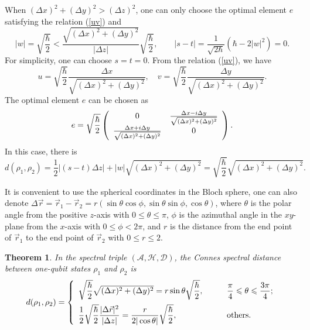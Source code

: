 \documentclass[a4paper,12pt]{article}
\newtheorem{theorem}{Theorem}
\begin{document}
When $(\Delta x)^2+(\Delta y)^2> (\Delta z)^2$,
one can only choose the optimal element $e$ satisfying the relation (\ref{uv}) and
\begin{equation}
	|w|
	=\sqrt{\frac{\hbar}{2}}<\frac{\sqrt{(\Delta x)^2+(\Delta y)^2}}{|\Delta z|}\sqrt{\frac{\hbar}{2}},\qquad
	|s-t|=\frac{1}{\sqrt{2\hbar}}(\hbar-2|w|^2)=0.
\end{equation}
For simplicity, one can choose $s=t=0$.
From the relation (\ref{uv}), we have
\begin{equation}
	u=\sqrt{\frac{\hbar}{2}}\frac{\Delta x}{\sqrt{(\Delta x)^2+(\Delta y)^2}},\quad v=\sqrt{\frac{\hbar}{2}}\frac{\Delta y}{\sqrt{(\Delta x)^2+(\Delta y)^2}}.
\end{equation}
The optimal element $e$ can be chosen as
\begin{equation}
	e=\sqrt{\frac{\hbar}{2}}\left(
	\begin{array}{cc}
		0 & \frac{\Delta x-{\rm i}\Delta y}{\sqrt{(\Delta x)^2+(\Delta y)^2}} \\[0.5em]
		\frac{\Delta x+{\rm i}\Delta y}{\sqrt{(\Delta x)^2+(\Delta y)^2}} & 0 \end{array}
	\right).
\end{equation}
In this case, there is
\begin{equation}\label{sd2}
	d(\rho_1,\rho_2)
	=\frac{1}{2}|(s-t)\Delta z|
	+|w|\sqrt{(\Delta x)^2+(\Delta y)^2}
	=\sqrt{\frac{\hbar}{2}}\sqrt{(\Delta x)^2+(\Delta y)^2}.
\end{equation}



It is convenient to use the spherical coordinates in the Bloch sphere, one can also denote $\Delta \vec{r}=\vec{r}_1-\vec{r}_2=r(\sin\theta\cos\phi, \sin\theta\sin\phi, \cos\theta)$, where $\theta$ is the polar angle from the positive $z$-axis with
$0\leqslant\theta\leqslant \pi$, $\phi$ is the azimuthal angle in the $xy$-plane from the $x$-axis with $0\leqslant\phi< 2\pi$, and $r$ is the distance from the end point of $\vec{r}_1$ to the end point of $\vec{r}_2$ with $0\leqslant r\leqslant 2$.

\begin{theorem}
	In the spectral triple $(\mathcal{A},\mathcal{H},\mathcal{D})$, the Connes spectral distance between one-qubit states $\rho_1$ and $\rho_2$ is
	\begin{equation}\label{drr}
		d(\rho_1, \rho_2)=
		\left\{
		\begin{array}{ll}
			\sqrt{\dfrac{\hbar}{2}}\sqrt{(\Delta x)^2+(\Delta y)^2}
			=r\sin\theta\sqrt{\dfrac{\hbar}{2}},
			& \qquad\hbox{$\dfrac{\pi}{4}\leqslant \theta \leqslant \dfrac{3\pi}{4}$;} \\[1em]
			\dfrac{1}{2}\sqrt{\dfrac{\hbar}{2}}\dfrac{|\Delta \vec{r}|^2}{|\Delta z|}
			=\dfrac{r}{2|\cos\theta|}\sqrt{\dfrac{\hbar}{2}},
			& \qquad\hbox{others.}
		\end{array}
		\right.
	\end{equation}
\end{theorem}
\end{document}
